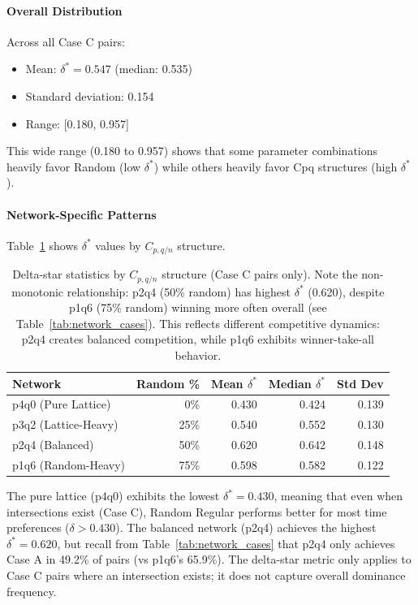 \documentclass[12pt,a4paper]{article}
\begin{document}
\paragraph{Overall Distribution}
Across all Case C pairs:
\begin{itemize}
    \item Mean: $\delta^* = 0.547$ (median: 0.535)
    \item Standard deviation: 0.154
    \item Range: [0.180, 0.957]
\end{itemize}

This wide range (0.180 to 0.957) shows that some parameter combinations heavily favor Random (low $\delta^*$) while others heavily favor Cpq structures (high $\delta^*$).

\paragraph{Network-Specific Patterns}

Table~\ref{tab:delta_star} shows $\delta^*$ values by $C_{p,q/n}$ structure.

\begin{table}[H]
\centering
\begin{tabular}{@{}lrrrr@{}}
\toprule
\textbf{Network} & \textbf{Random \%} & \textbf{Mean $\delta^*$} & \textbf{Median $\delta^*$} & \textbf{Std Dev} \\
\midrule
p4q0 (Pure Lattice)  & 0\%  & 0.430 & 0.424 & 0.139 \\
p3q2 (Lattice-Heavy) & 25\% & 0.540 & 0.552 & 0.130 \\
p2q4 (Balanced)      & 50\% & 0.620 & 0.642 & 0.148 \\
p1q6 (Random-Heavy)  & 75\% & 0.598 & 0.582 & 0.122 \\
\bottomrule
\end{tabular}
\caption{Delta-star statistics by $C_{p,q/n}$ structure (Case C pairs only). Note the non-monotonic relationship: p2q4 (50\% random) has highest $\delta^*$ (0.620), despite p1q6 (75\% random) winning more often overall (see Table~\ref{tab:network_cases}). This reflects different competitive dynamics: p2q4 creates balanced competition, while p1q6 exhibits winner-take-all behavior.}
\label{tab:delta_star}
\end{table}

The pure lattice (p4q0) exhibits the lowest $\delta^* = 0.430$, meaning that even when intersections exist (Case C), Random Regular performs better for most time preferences ($\delta > 0.430$). The balanced network (p2q4) achieves the highest $\delta^* = 0.620$, but recall from Table~\ref{tab:network_cases} that p2q4 only achieves Case A in 49.2\% of pairs (vs p1q6's 65.9\%). The delta-star metric only applies to Case C pairs where an intersection exists; it does not capture overall dominance frequency.
\end{document}
